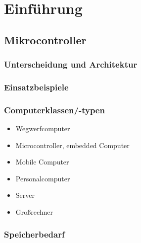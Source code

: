 \chapter{Einführung}
\section{Mikrocontroller}
\subsection{Unterscheidung und Architektur}

\subsection{Einsatzbeispiele}
\subsection*{Computerklassen/-typen}
\begin{itemize}
\item Wegwerfcomputer
\item Microcontroller, embedded Computer
\item Mobile Computer
\item Personalcomputer
\item Server
\item Großrechner
\end{itemize}

\subsection{Speicherbedarf}

